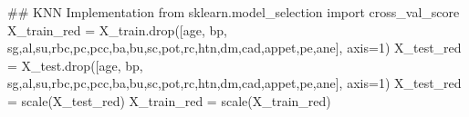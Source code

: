 \documentclass[
  11pt,
  letterpaper,
  DIV=11,
  numbers=noendperiod]{scrartcl}
\newenvironment{Shaded}{\begin{snugshade}}{\end{snugshade}}
\newcommand{\CommentTok}[1]{\textcolor[rgb]{0.37,0.37,0.37}{#1}}
\newcommand{\DecValTok}[1]{\textcolor[rgb]{0.68,0.00,0.00}{#1}}
\newcommand{\ImportTok}[1]{\textcolor[rgb]{0.00,0.46,0.62}{#1}}
\newcommand{\NormalTok}[1]{\textcolor[rgb]{0.00,0.23,0.31}{#1}}
\newcommand{\OperatorTok}[1]{\textcolor[rgb]{0.37,0.37,0.37}{#1}}
\newcommand{\StringTok}[1]{\textcolor[rgb]{0.13,0.47,0.30}{#1}}
\begin{document}
\begin{Shaded}
\begin{Highlighting}[]
\CommentTok{\#\# KNN Implementation}
\ImportTok{from}\NormalTok{ sklearn.model\_selection }\ImportTok{import}\NormalTok{ cross\_val\_score}
\NormalTok{X\_train\_red }\OperatorTok{=}\NormalTok{ X\_train.drop([}\StringTok{\textquotesingle{}age\textquotesingle{}}\NormalTok{, }\StringTok{\textquotesingle{}bp\textquotesingle{}}\NormalTok{, }\StringTok{\textquotesingle{}sg\textquotesingle{}}\NormalTok{,}\StringTok{\textquotesingle{}al\textquotesingle{}}\NormalTok{,}\StringTok{\textquotesingle{}su\textquotesingle{}}\NormalTok{,}\StringTok{\textquotesingle{}rbc\textquotesingle{}}\NormalTok{,}\StringTok{\textquotesingle{}pc\textquotesingle{}}\NormalTok{,}\StringTok{\textquotesingle{}pcc\textquotesingle{}}\NormalTok{,}\StringTok{\textquotesingle{}ba\textquotesingle{}}\NormalTok{,}\StringTok{\textquotesingle{}bu\textquotesingle{}}\NormalTok{,}\StringTok{\textquotesingle{}sc\textquotesingle{}}\NormalTok{,}\StringTok{\textquotesingle{}pot\textquotesingle{}}\NormalTok{,}\StringTok{\textquotesingle{}rc\textquotesingle{}}\NormalTok{,}\StringTok{\textquotesingle{}htn\textquotesingle{}}\NormalTok{,}\StringTok{\textquotesingle{}dm\textquotesingle{}}\NormalTok{,}\StringTok{\textquotesingle{}cad\textquotesingle{}}\NormalTok{,}\StringTok{\textquotesingle{}appet\textquotesingle{}}\NormalTok{,}\StringTok{\textquotesingle{}pe\textquotesingle{}}\NormalTok{,}\StringTok{\textquotesingle{}ane\textquotesingle{}}\NormalTok{], axis}\OperatorTok{=}\DecValTok{1}\NormalTok{)}
\NormalTok{X\_test\_red }\OperatorTok{=}\NormalTok{  X\_test.drop([}\StringTok{\textquotesingle{}age\textquotesingle{}}\NormalTok{, }\StringTok{\textquotesingle{}bp\textquotesingle{}}\NormalTok{, }\StringTok{\textquotesingle{}sg\textquotesingle{}}\NormalTok{,}\StringTok{\textquotesingle{}al\textquotesingle{}}\NormalTok{,}\StringTok{\textquotesingle{}su\textquotesingle{}}\NormalTok{,}\StringTok{\textquotesingle{}rbc\textquotesingle{}}\NormalTok{,}\StringTok{\textquotesingle{}pc\textquotesingle{}}\NormalTok{,}\StringTok{\textquotesingle{}pcc\textquotesingle{}}\NormalTok{,}\StringTok{\textquotesingle{}ba\textquotesingle{}}\NormalTok{,}\StringTok{\textquotesingle{}bu\textquotesingle{}}\NormalTok{,}\StringTok{\textquotesingle{}sc\textquotesingle{}}\NormalTok{,}\StringTok{\textquotesingle{}pot\textquotesingle{}}\NormalTok{,}\StringTok{\textquotesingle{}rc\textquotesingle{}}\NormalTok{,}\StringTok{\textquotesingle{}htn\textquotesingle{}}\NormalTok{,}\StringTok{\textquotesingle{}dm\textquotesingle{}}\NormalTok{,}\StringTok{\textquotesingle{}cad\textquotesingle{}}\NormalTok{,}\StringTok{\textquotesingle{}appet\textquotesingle{}}\NormalTok{,}\StringTok{\textquotesingle{}pe\textquotesingle{}}\NormalTok{,}\StringTok{\textquotesingle{}ane\textquotesingle{}}\NormalTok{], axis}\OperatorTok{=}\DecValTok{1}\NormalTok{)}
\NormalTok{X\_test\_red }\OperatorTok{=}\NormalTok{ scale(X\_test\_red)}
\NormalTok{X\_train\_red }\OperatorTok{=}\NormalTok{ scale(X\_train\_red)}


\end{Highlighting}
\end{Shaded}
\end{document}
